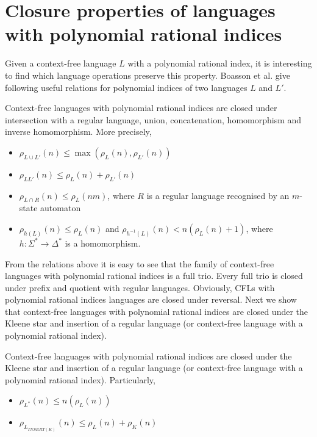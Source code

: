 \section{Closure properties of languages with polynomial rational indices}
\label{sec:closure}
Given a context-free language $L$ with a polynomial rational index, it is interesting to find which language operations preserve this property.  Boasson et al. \cite{RatBasic} give following useful relations for polynomial indices of two languages $L$ and $L'$.
\begin{theorem}
Context-free languages with polynomial rational indices are closed under intersection with a regular language, union, concatenation, homomorphism and inverse homomorphism. More precisely,
\begin{itemize}
\item $\rho_{L \cup L'}(n) \le  \max{(\rho_L(n), \rho_{L'}(n))} $
\item $\rho_{LL'}(n) \le \rho_L(n) + \rho_{L'}(n)$
\item $\rho_{L \cap R}(n) \le \rho_L(nm)$, where $R$ is a regular language recognised by an $m$-state automaton
\item $\rho_{h(L)}(n) \le \rho_L(n)$ and $\rho_{h^{-1}(L)}(n) < n(\rho_L(n) +1)$, where $h: \Sigma^* \rightarrow \Delta^*$ is a homomorphism.
\end{itemize}
\end{theorem}
From the relations above it is easy to see that the family of context-free languages with polynomial rational indices is a full trio. Every full trio is closed under prefix and quotient with regular languages. Obviously, CFLs with polynomial rational indices languages are closed under reversal.  Next we show that context-free languages with polynomial rational indices are closed under the Kleene star and insertion of a regular language (or context-free language with a polynomial rational index).
\begin{theorem}
Context-free languages with polynomial rational indices are closed under the Kleene star and insertion of a regular language  (or context-free language with a polynomial rational index). Particularly,
\begin{itemize}
\item $\rho_{L^{*}}(n) \le n(\rho_L(n))$
\item $\rho_{L_{INSERT(K)}}(n) \le \rho_L(n) + \rho_{K}(n)$
\end{itemize}
\end{theorem}
